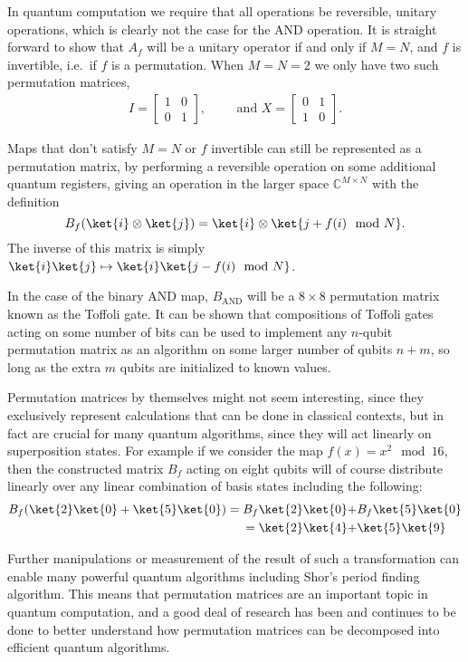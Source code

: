 In quantum computation we require that all operations be reversible, unitary operations, which is clearly not the case for the AND operation. It is straight forward to show that $A_f$ will be a unitary operator if and only if $M=N$, and $f$ is invertible, i.e.\ if $f$ is a permutation. When $M = N = 2$ we only have two such permutation matrices,
\begin{align*}
	I = \left[\begin{matrix}
		1&0\\
		0&1
	\end{matrix}\right],
	&&&
	\text{and\ }X = \left[\begin{matrix}
		0&1\\
		1&0
	\end{matrix}\right].
\end{align*}

Maps that don't satisfy $M = N$ or $f$ invertible can still be represented as a permutation matrix, by performing a reversible operation on some additional quantum registers, giving an operation in the larger space $\mathbb{C}^{M\times N}$ with the definition
\[B_f(\ket{i}\otimes\ket{j}) = \ket{i}\otimes\ket{j+f(i) \mod N}.\]
The inverse of this matrix is simply $\ket{i}\ket{j} \mapsto \ket{i}\ket{j-f(i) \mod N}$.

In the case of the binary AND map, $B_{\text{AND}}$ will be a $8\times8$ permutation matrix known as the Toffoli gate. It can be shown that compositions of Toffoli gates acting on some number of bits can be used to implement any $n$-qubit permutation matrix as an algorithm on some larger number of qubits $n+m$, so long as the extra $m$ qubits are initialized to known values.

Permutation matrices by themselves might not seem interesting, since they exclusively represent calculations that can be done in classical contexts, but in fact are crucial for many quantum algorithms, since they will act linearly on superposition states. For example if we consider the map $f(x) = x^2\mod 16$, then the constructed matrix $B_f$ acting on eight qubits will of course distribute linearly over any linear combination of basis states including the following:
\begin{align*}
	B_f(\ket{2}\ket{0}+\ket{5}\ket{0}) 
	= B_f\ket{2}\ket{0} +& B_f\ket{5}\ket{0}
	\\= \ket{2}\ket{4} +& \ket{5}\ket{9}
\end{align*}

Further manipulations or measurement of the result of such a transformation can enable many powerful quantum algorithms including Shor's period finding algorithm. This means that permutation matrices are an important topic in quantum computation, and a good deal of research has been and continues to be done to better understand how permutation matrices can be decomposed into efficient quantum algorithms.

